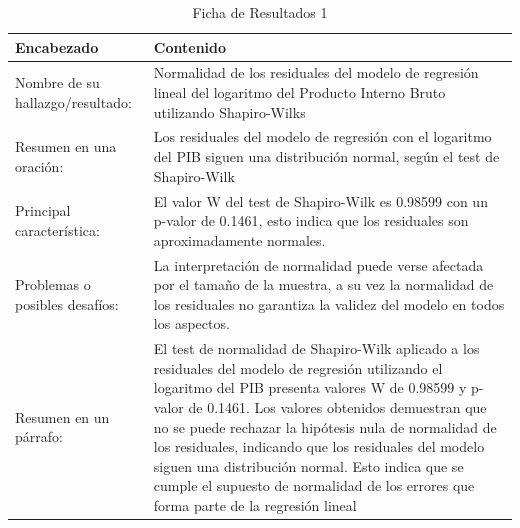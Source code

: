 \begin{table}[H]
    \caption{Ficha de Resultados 1}
    \begin{center}
        \begin{tabular}{  m{3cm} | m{12cm}  }
        \hline
        \textbf{ Encabezado} & \textbf{Contenido }\\ 
        \hline
        Nombre de su hallazgo/resultado: & Normalidad de los residuales del modelo de regresión lineal del logaritmo del Producto Interno Bruto utilizando Shapiro-Wilks \\ 
        \hline
        Resumen en una oración: & Los residuales del modelo de regresión con el logaritmo del PIB siguen una distribución normal, según el test de Shapiro-Wilk\\ 
        \hline
        Principal característica: & El valor W del test de Shapiro-Wilk es 0.98599 con un p-valor de 0.1461, esto indica que los residuales son aproximadamente normales.\\ 
        \hline
        Problemas o posibles desafíos: & La interpretación de normalidad puede verse afectada por el tamaño de la muestra, a su vez la normalidad de los residuales no garantiza la validez del modelo en todos los aspectos.\\ 
        \hline
        Resumen en un párrafo: & El test de normalidad de Shapiro-Wilk aplicado a los residuales del modelo de regresión utilizando el logaritmo del PIB presenta valores W de 0.98599 y p-valor de 0.1461. Los valores obtenidos demuestran que no se puede rechazar la hipótesis nula de normalidad de los residuales, indicando que los residuales del modelo siguen una distribución normal. Esto indica que se cumple el supuesto de normalidad de los errores que forma parte de la regresión lineal \\ 
        \hline
        \end{tabular}
    \end{center}
\end{table}

